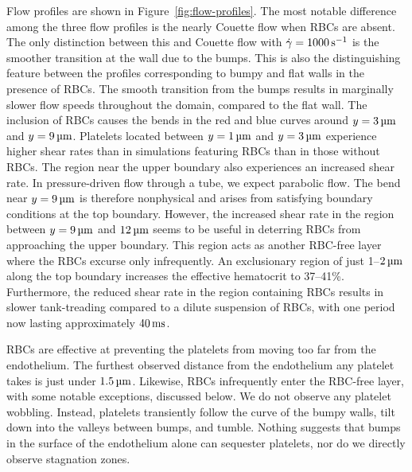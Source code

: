 Flow profiles are shown in Figure~\ref{fig:flow-profiles}. The most notable difference
among the three flow profiles is the nearly Couette flow when RBCs are absent. The only
distinction between this and Couette flow with $\shear=1000\persec$ is the smoother
transition at the wall due to the bumps. This is also the distinguishing feature between
the profiles corresponding to bumpy and flat walls in the presence of RBCs. The smooth
transition from the bumps results in marginally slower flow speeds throughout the domain,
compared to the flat wall. The inclusion of RBCs causes the bends in the red and blue
curves around $y = 3\um$ and $y = 9\um$. Platelets located between $y=1\um$ and $y=3\um$
experience higher shear rates than in simulations featuring RBCs than in those without
RBCs. The region near the upper boundary also experiences an increased shear rate. In
pressure-driven flow through a tube, we expect parabolic flow. The bend near $y = 9\um$
is therefore nonphysical and arises from satisfying boundary conditions at the top
boundary. However, the increased shear rate in the region between $y = 9\um$ and $12\um$
seems to be useful in deterring RBCs from approaching the upper boundary. This region
acts as another RBC-free layer where the RBCs excurse only infrequently. An exclusionary
region of just 1--$2\um$ along the top boundary increases the effective hematocrit to
37--41\%. Furthermore, the reduced shear rate in the region containing RBCs results in
slower tank-treading compared to a dilute suspension of RBCs, with one period now lasting
approximately $40\ms$.

RBCs are effective at preventing the platelets from moving too far from the endothelium.
The furthest observed distance from the endothelium any platelet takes is just under
$1.5\um$. Likewise, RBCs infrequently enter the RBC-free layer, with some notable
exceptions, discussed below. We do not observe any platelet wobbling. Instead, platelets
transiently follow the curve of the bumpy walls, tilt down into the valleys between
bumps, and tumble. Nothing suggests that bumps in the surface of the endothelium alone
can sequester platelets, nor do we directly observe stagnation zones.

